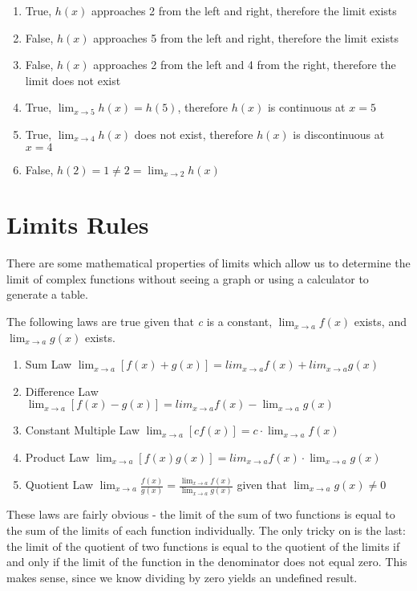 \begin{Answer}[ref=limits6]
	\begin{enumerate}
	\item True, $h(x)$ approaches 2 from the left and right, therefore the limit exists
	\item False, $h(x)$ approaches 5 from the left and right, therefore the limit exists
	\item False, $h(x)$ approaches 2 from the left and 4 from the right, therefore the limit does not exist
	\item True, $\lim_{x \to 5}h(x) = h(5)$, therefore $h(x)$ is continuous at $x=5$
	\item True, $\lim_{x \to 4}h(x)$ does not exist, therefore $h(x)$ is discontinuous at $x=4$
	\item False, $h(2) = 1 \neq 2 = \lim_{x \to 2}h(x)$
	\end{enumerate}
\end{Answer}

\section{Limits Rules}
There are some mathematical properties of limits which allow us to determine the 
limit of complex functions without seeing a graph or using a calculator to generate 
a table. 

The following laws are true given that \textit{c} is a constant, $\lim_{x\to a} 
f(x) $ exists, and $\lim_{x\to a} g(x) $ exists.

\begin{enumerate}
    \item Sum Law $\lim_{x\to a} \left[f(x) + g(x) \right] = lim_{x\to a} f(x) + lim_{x\to a} g(x)$
    \item Difference Law $\lim_{x\to a} \left[f(x) - g(x) \right] = lim_{x\to a} f(x) - \lim_{x\to a} g(x)$
    \item Constant Multiple Law $\lim_{x\to a} \left[\textit{c}f(x) \right] = \textit{c} \cdot \lim_{x\to a}    f(x) $
    \item Product Law $\lim_{x\to a} \left[f(x)g(x) \right] = lim_{x\to a}f(x) \cdot \lim_{x\to a} g(x)$
    \item Quotient Law $\lim_{x\to a} \frac{f(x)}{g(x)} = \frac{\lim_{x\to a} f(x)}{\lim_{x\to a} g(x)}$ given that $\lim_{x\to a} g(x) \neq 0$
\end{enumerate}
These laws are fairly obvious - the limit of the sum of two functions is equal to 
the sum of the limits of each function individually. The only tricky on is the 
last: the limit of the quotient of two functions is equal to the quotient of the 
limits if and only if the limit of the function in the denominator does not equal 
zero. This makes sense, since we know dividing by zero yields an undefined result. 

